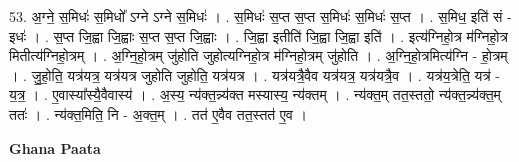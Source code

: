 \documentclass[17pt]{extarticle}
\begin{document}
53. अ॒ग्ने॒ स॒मिधः॑ स॒मिधो᳚ ऽग्ने ऽग्ने स॒मिधः॑ । . स॒मिधः॑ स॒प्त स॒प्त स॒मिधः॑ स॒मिधः॑ स॒प्त । . स॒मिध॒ इति॑ सं - इधः॑ । . स॒प्त जि॒ह्वा जि॒ह्वाः स॒प्त स॒प्त जि॒ह्वाः । . जि॒ह्वा इतीति॑ जि॒ह्वा जि॒ह्वा इति॑ । . इत्य॑ग्निहो॒त्र म॑ग्निहो॒त्र मितीत्य॑ग्निहो॒त्रम् । . अ॒ग्नि॒हो॒त्रम् जु॑होति जुहोत्यग्निहो॒त्र म॑ग्निहो॒त्रम् जु॑होति । . अ॒ग्नि॒हो॒त्रमित्य॑ग्नि - हो॒त्रम् । . जु॒हो॒ति॒ यत्र॑यत्र॒ यत्र॑यत्र जुहोति जुहोति॒ यत्र॑यत्र । . यत्र॑यत्रै॒वैव यत्र॑यत्र॒ यत्र॑यत्रै॒व । . यत्र॑य॒त्रेति॒ यत्र॑ - य॒त्र॒ । . ए॒वास्या᳚स्यै॒वैवास्य॑ । . अ॒स्य॒ न्य॑क्त॒न्न्य॑क्त मस्यास्य॒ न्य॑क्तम् । . न्य॑क्त॒म् तत॒स्ततो॒ न्य॑क्त॒न्न्य॑क्त॒म् ततः॑ । . न्य॑क्त॒मिति॒ नि - अ॒क्त॒म् । . तत॑ ए॒वैव तत॒स्तत॑ ए॒व । \newline

\textbf{Ghana Paata } \newline
\end{document}
